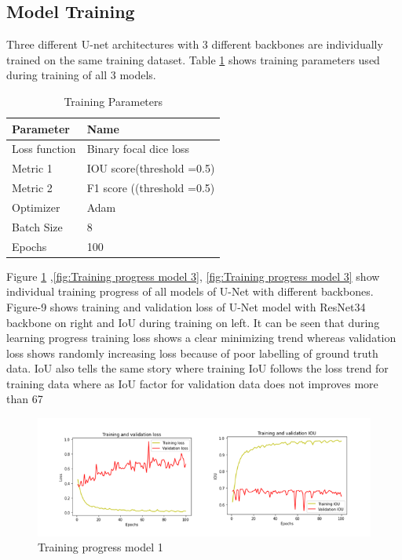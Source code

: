 \documentclass[rnd]{mas_proposal}
\begin{document}
\subsection{Model Training}

Three different U-net architectures with 3 different backbones are individually trained on the same training dataset.  
Table \ref{tab:Training} shows training parameters used during training of  all 3 models.

\begin{table}[h]
        \centering
        \begin{tabular}{|l|l|}
        \hline
        \textbf{Parameter} & \textbf{Name}              \\ \hline
        Loss function      & Binary focal dice loss     \\ \hline
        Metric 1           & IOU score(threshold =0.5)  \\ \hline
        Metric 2           & F1 score ((threshold =0.5) \\ \hline
        Optimizer          & Adam                       \\ \hline
        Batch Size         & 8                          \\ \hline
        Epochs             & 100                        \\ \hline
        \end{tabular}
        \caption{Training Parameters}
        \label{tab:Training}
        \end{table}



Figure \ref{fig:Training progress model 1} ,\ref{fig:Training progress model 3}, \ref{fig:Training progress model 3} show individual training progress of all models of U-Net with different backbones. Figure-9 shows training and validation loss of U-Net model
with ResNet34 backbone on right and IoU during training on left. It can be seen that during learning progress training loss shows a clear minimizing trend 
whereas validation loss shows randomly increasing loss because of poor labelling of ground truth data. IoU also tells the same story where training IoU
follows the loss trend for training data where as IoU factor for validation data does not improves more than 67%

\begin{figure}[htp] 
        \centering
        \includegraphics[width=1.2\textwidth]{images/fig9.png}
        \caption{Training progress model 1}%
        \label{fig:Training progress model 1}%
\end{figure}
\end{document}
